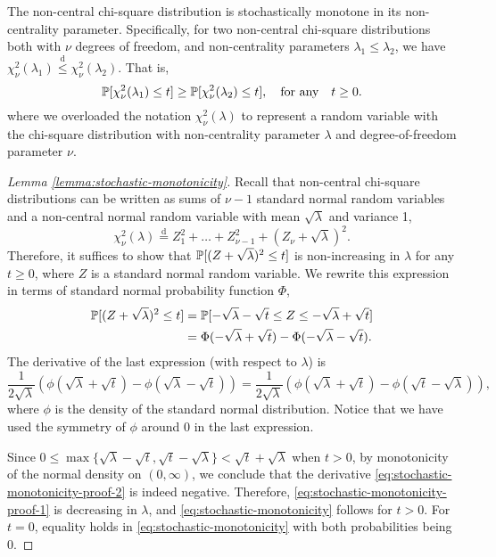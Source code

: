 \begin{lemma} \label{lemma:stochastic-monotonicity}
The non-central chi-square distribution is stochastically monotone in its non-centrality parameter.
Specifically, for two non-central chi-square distributions both with $\nu$ degrees of freedom, and non-centrality parameters $\lambda_1 \le \lambda_2$, we have $\chi^2_\nu(\lambda_1) \stackrel{\mathrm{d}}{\le} \chi^2_\nu(\lambda_2)$. 
That is,
\begin{equation} \label{eq:stochastic-monotonicity}
    \P[\chi^2_\nu(\lambda_1) \le t] \ge \P[\chi^2_\nu(\lambda_2) \le t], \quad \text{for any}\quad t\ge0.
\end{equation}
where we overloaded the notation $\chi_\nu^2(\lambda)$ to represent a random variable with the chi-square distribution with non-centrality parameter $\lambda$ and degree-of-freedom parameter $\nu$.
\end{lemma}

\begin{proof}[Lemma \ref{lemma:stochastic-monotonicity}]
Recall that non-central chi-square distributions can be written as sums of $\nu-1$ standard normal random variables and a non-central normal random variable with mean $\sqrt{\lambda}$ and variance 1,
\begin{equation*}
    \chi_\nu^2(\lambda) 
    \stackrel{\mathrm{d}}{=} Z_1^2 + \ldots + Z_{\nu-1}^2 + (Z_\nu + \sqrt{\lambda})^2.
\end{equation*}
Therefore, it suffices to show that $\P[(Z+\sqrt{\lambda})^2 \le t]$ is non-increasing in $\lambda$ for any $t\ge0$, where $Z$ is a standard normal random variable.
We rewrite this expression in terms of standard normal probability function $\Phi$,
\begin{align}
    \P[(Z+\sqrt{\lambda})^2 \le t] 
    &= \P[-\sqrt{\lambda} - \sqrt{t} \le Z \le -\sqrt{\lambda} + \sqrt{t}] \nonumber \\
    &= \Phi(-\sqrt{\lambda} + \sqrt{t}) - \Phi(-\sqrt{\lambda} - \sqrt{t}). \label{eq:stochastic-monotonicity-proof-1}
\end{align}
The derivative of the last expression (with respect to $\lambda$) is 
\begin{equation} \label{eq:stochastic-monotonicity-proof-2}
    \frac{1}{2\sqrt{\lambda}} \left(\phi(\sqrt{\lambda} + \sqrt{t}) - \phi(\sqrt{\lambda} - \sqrt{t})\right) 
    = \frac{1}{2\sqrt{\lambda}} \left(\phi(\sqrt{\lambda} + \sqrt{t}) - \phi(\sqrt{t} - \sqrt{\lambda})\right),
\end{equation}
where $\phi$ is the density of the standard normal distribution.
Notice that we have used the symmetry of $\phi$ around 0 in the last expression.

Since $0 \le \max\{\sqrt{\lambda} - \sqrt{t}, \sqrt{t} - \sqrt{\lambda}\} < \sqrt{t} + \sqrt{\lambda}$ when $t>0$, by monotonicity of the normal density on $(0,\infty)$, we conclude that the derivative \eqref{eq:stochastic-monotonicity-proof-2} is indeed negative.
Therefore, \eqref{eq:stochastic-monotonicity-proof-1} is decreasing in $\lambda$, and \eqref{eq:stochastic-monotonicity} follows for $t>0$.
For $t = 0$, equality holds in \eqref{eq:stochastic-monotonicity} with both probabilities being 0.
\end{proof}


